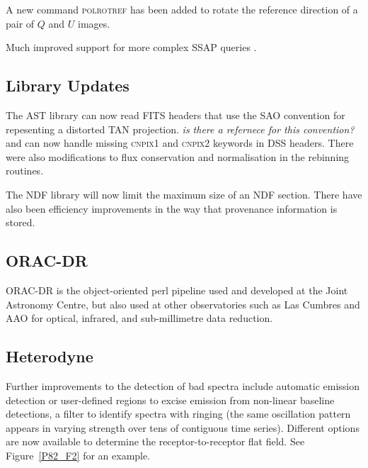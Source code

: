 \documentclass[11pt,twoside]{article}
\begin{document}



A new command \textsc{polrotref} has been added to rotate the
reference direction of a pair of $Q$ and $U$ images.


Much improved support for more complex SSAP queries \citep[see][for a
protocol introduction]{2004SPIE.5493..262D}.

\subsection*{Library Updates}


The AST library \citep[see][and references
therein]{2012ASPC..461..825B} can now read FITS headers that use the
SAO convention for repesenting a distorted TAN projection. \textit{is
  there a refernece for this convention?} and can now handle missing
\textsc{cnpix1} and \textsc{cnpix2} keywords in DSS headers. There
were also modifications to flux conservation and normalisation in the
rebinning routines.


The NDF library will now limit the maximum size of an NDF
section. There have also been efficiency improvements in the way that
provenance information is stored.

\subsection*{ORAC-DR}

ORAC-DR \citep{Cavanagh2008} is the object-oriented perl pipeline used
and developed at the Joint Astronomy Centre, but also used at other
observatories such as Las Cumbres and AAO for optical, infrared, and
sub-millimetre data reduction.

\subsection*{Heterodyne}

Further improvements to the detection of bad spectra
\citep{P61_adassxxii} include automatic emission detection or
user-defined regions to excise emission from non-linear baseline
detections, a filter to identify spectra with ringing (the same
oscillation pattern appears in varying strength over tens of
contiguous time series).  Different options are now available to
determine the receptor-to-receptor flat field.  See
Figure~\ref{P82_F2} for an example.
\end{document}
